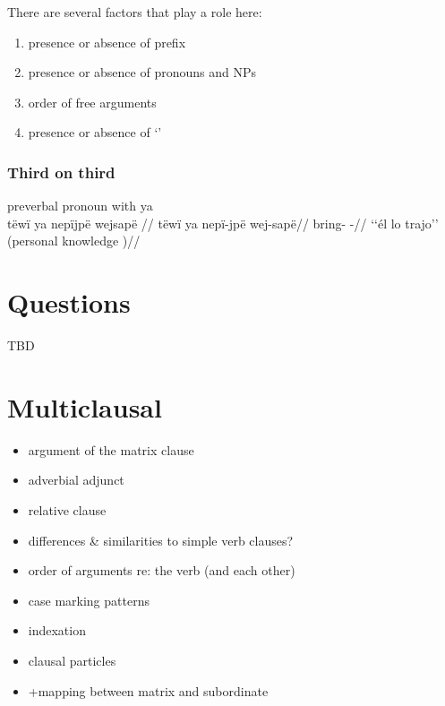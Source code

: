 \documentclass{memoir}
\begin{document}
There are several factors that play a role here:

\begin{enumerate}
\def\labelenumi{\arabic{enumi}.}
\tightlist
\item
  presence or absence of prefix
\item
  presence or absence of pronouns and NPs
\item
  order of free arguments
\item
  presence or absence of  `'
\end{enumerate}

\subsection{Third on third}

\ex  preverbal pronoun with ya  \\\label{convcosnoind-132}
\begingl \glpreamble tëwï ya nepïjpë wejsapë //
\gla tëwï ya nepï-jpë wej-sapë//
\glb {}  bring- -//
\glft ‘‘él lo trajo’’ (personal knowledge
)//
\endgl
\xe

\chapter{\texorpdfstring{Questions \label{questions}}{Questions }}

TBD

\chapter{\texorpdfstring{Multiclausal
\label{multiclausal}}{Multiclausal }}

\begin{itemize}
\item
  argument of the matrix clause
\item
  adverbial adjunct
\item
  relative clause
\item
  differences \& similarities to simple verb clauses?
\item
  order of arguments re: the verb (and each other)
\item
  case marking patterns
\item
  indexation
\item
  clausal particles
\item
  +mapping between matrix and subordinate
\end{itemize}
\end{document}
